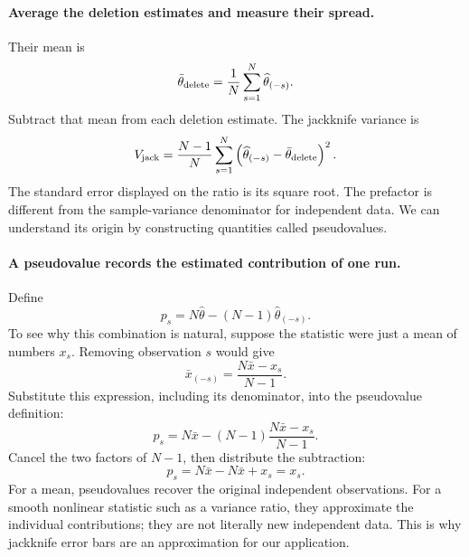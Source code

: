 \documentclass[11pt]{article}
\begin{document}
\paragraph{Average the deletion estimates and measure their spread.}
Their mean is
\begin{equation}
 \bar\theta_{\rm delete}=\frac1N\sum_{s=1}^{N}\widehat\theta_{(-s)}.
\end{equation}
Subtract that mean from each deletion estimate. The jackknife variance is
\begin{equation}
 V_{\rm jack}=\frac{N-1}{N}\sum_{s=1}^{N}
 \left(\widehat\theta_{(-s)}-\bar\theta_{\rm delete}\right)^2.
 \label{eq:jackknife-variance}
\end{equation}
The standard error displayed on the ratio is its square root. The prefactor
is different from the sample-variance denominator for independent data.
We can understand its origin by constructing quantities called pseudovalues.

\paragraph{A pseudovalue records the estimated contribution of one run.}
Define
\begin{equation}
 p_s=N\widehat\theta-(N-1)\widehat\theta_{(-s)}.
\end{equation}
To see why this combination is natural, suppose the statistic were just a
mean of numbers $x_s$. Removing observation $s$ would give
\begin{equation}
 \bar x_{(-s)}=\frac{N\bar x-x_s}{N-1}.
\end{equation}
Substitute this expression, including its denominator, into the
pseudovalue definition:
\begin{equation}
 p_s=N\bar x-(N-1)\frac{N\bar x-x_s}{N-1}.
\end{equation}
Cancel the two factors of $N-1$, then distribute the subtraction:
\begin{equation}
 p_s=N\bar x-N\bar x+x_s=x_s.
\end{equation}
For a mean, pseudovalues recover the original independent observations.
For a smooth nonlinear statistic such as a variance ratio, they approximate
the individual contributions; they are not literally new independent data.
This is why jackknife error bars are an approximation for our application.
\end{document}
